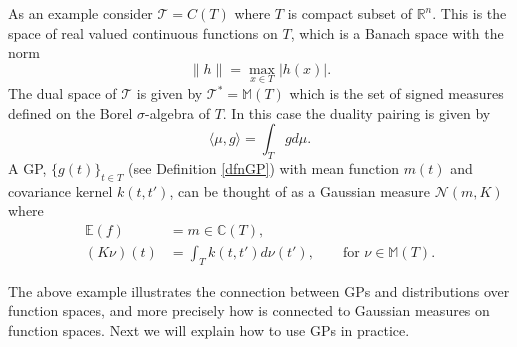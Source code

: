 \documentclass{sfuthesis}
\newcommand{\E}{\mathbb{E}} %
\newcommand{\tvs}{\mathscr{T}} %
\begin{document}
As an example consider  $\tvs=C(T)$ where 
$T$ is compact subset of $\mathbb{R}^{n}$. This is the  space of real valued continuous functions 
on
$T$, which is a Banach
space with the norm \cite{bressan1900lecture}
\begin{equation*}
\|h\|=\max_{x\in T}|h(x)|.
\end{equation*}
The dual space of $\tvs$ is given by $\tvs^{*}=\mathbb{M}(T)$ which is the set of signed measures defined on 
the Borel $\sigma$-algebra of  $T$. In this 
case the duality pairing is given by 
\begin{equation*}
\langle\mu,g \rangle=\int_{T}gd\mu.
\end{equation*}
A GP,  $\{g(t)\}_{t\in T}$ (see Definition \ref{dfnGP}) with mean function $m(t)$ and 
covariance kernel $k(t,t')$, can be thought of as a Gaussian measure $\mathcal{N}(m,K)$
where
\cite{lifshits2012lectures} 
\begin{align*}
\E(f)&=m\in\mathbb{C}(T), \\
(K\nu)(t)&=\int_{T}k(t,t')d\nu(t'),\qquad\text{for }\nu\in\mathbb{M}(T).
\end{align*}

The above example illustrates the connection between GPs and distributions over function spaces, and more
precisely how  is connected to Gaussian measures on function spaces. Next we will
explain how to use GPs in practice.
\end{document}
